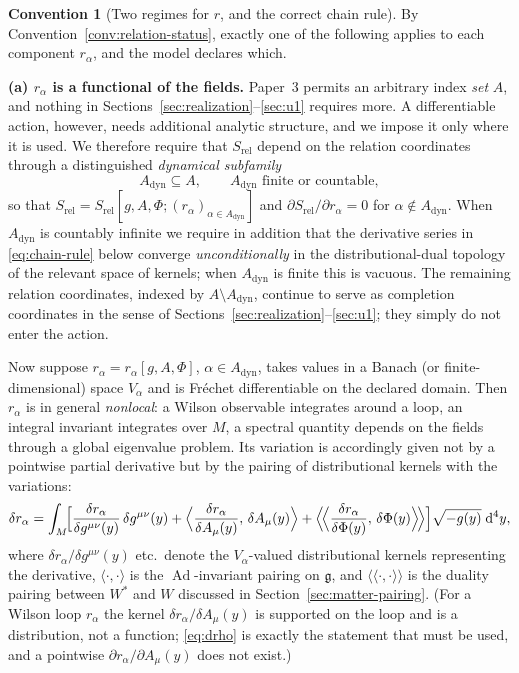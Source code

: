 \documentclass[11pt,a4paper]{article}
\theoremstyle{plain}
\theoremstyle{definition}
\newtheorem{convention}[theorem]{Convention}
\theoremstyle{remark}
\newcommand{\gfrak}{\mathfrak{g}}
\newcommand{\Ad}{\operatorname{Ad}}
\begin{document}
\begin{convention}[Two regimes for $r$, and the correct chain rule]
\label{conv:two-regimes}
By Convention~\ref{conv:relation-status}, exactly one of the following applies to each component
$r_\alpha$, and the model declares which.

\medskip
\noindent\textbf{(a) $r_\alpha$ is a functional of the fields.}
Paper~3 permits an arbitrary index \emph{set} $A$, and nothing in
Sections~\ref{sec:realization}--\ref{sec:u1} requires more. A differentiable action, however, needs
additional analytic structure, and we impose it only where it is used. We therefore require that
$S_{\mathrm{rel}}$ depend on the relation coordinates through a distinguished \emph{dynamical
subfamily}
\begin{equation}
\label{eq:Adyn}
A_{\mathrm{dyn}}\subseteq A,
\qquad
A_{\mathrm{dyn}} \text{ finite or countable},
\end{equation}
so that $S_{\mathrm{rel}}=S_{\mathrm{rel}}[g,A,\Phi;(r_\alpha)_{\alpha\in A_{\mathrm{dyn}}}]$ and
$\partial S_{\mathrm{rel}}/\partial r_\alpha=0$ for $\alpha\notin A_{\mathrm{dyn}}$. When
$A_{\mathrm{dyn}}$ is countably infinite we require in addition that the derivative series in
\eqref{eq:chain-rule} below converge \emph{unconditionally} in the distributional-dual topology of
the relevant space of kernels; when $A_{\mathrm{dyn}}$ is finite this is vacuous. The remaining
relation coordinates, indexed by $A\setminus A_{\mathrm{dyn}}$, continue to serve as completion
coordinates in the sense of Sections~\ref{sec:realization}--\ref{sec:u1}; they simply do not enter
the action.

Now suppose $r_\alpha=r_\alpha[g,A,\Phi]$, $\alpha\in A_{\mathrm{dyn}}$, takes values in a Banach
(or finite-dimensional) space $V_\alpha$ and is Fr\'echet differentiable on the declared domain.
Then $r_\alpha$ is in general \emph{nonlocal}: a Wilson observable integrates around a loop, an
integral invariant integrates over $M$, a spectral quantity depends on the fields through a global
eigenvalue problem. Its variation is accordingly given not by a pointwise partial derivative but by
the pairing of distributional kernels with the variations:
\begin{equation}
\label{eq:drho}
\delta r_\alpha
=\int_M\!\Bigl[
\frac{\delta r_\alpha}{\delta g^{\mu\nu}(y)}\,\delta g^{\mu\nu}(y)
+\Bigl\langle \frac{\delta r_\alpha}{\delta A_\mu(y)},\,\delta A_\mu(y)\Bigr\rangle
+\Bigl\langle\!\Bigl\langle \frac{\delta r_\alpha}{\delta \Phi(y)},\,\delta\Phi(y)
\Bigr\rangle\!\Bigr\rangle
\Bigr]\sqrt{-g(y)}\;\mathrm{d}^4y ,
\end{equation}
where $\delta r_\alpha/\delta g^{\mu\nu}(y)$ etc.\ denote the $V_\alpha$-valued distributional
kernels representing the derivative, $\langle\cdot,\cdot\rangle$ is the $\Ad$-invariant pairing on
$\gfrak$, and $\langle\!\langle\cdot,\cdot\rangle\!\rangle$ is the duality pairing between
$W^{*}$ and $W$ discussed in Section~\ref{sec:matter-pairing}. (For a Wilson loop $r_\alpha$ the
kernel $\delta r_\alpha/\delta A_\mu(y)$ is supported on the loop and is a distribution, not a
function; \eqref{eq:drho} is exactly the statement that must be used, and a pointwise
$\partial r_\alpha/\partial A_\mu(y)$ does not exist.)


\end{convention}
\end{document}
